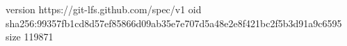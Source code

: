 version https://git-lfs.github.com/spec/v1
oid sha256:99357fb1cd8d57ef85866d09ab35e7e707d5a48e2e8f421bc2f5b3d91a9c6595
size 119871
